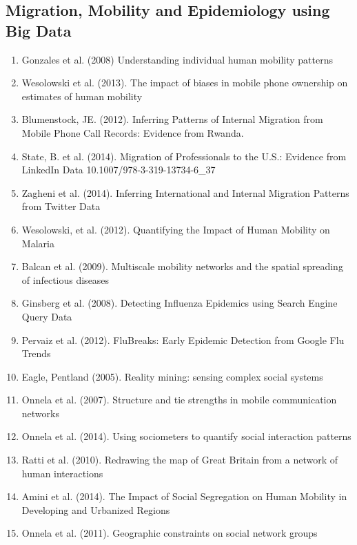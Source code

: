\subsection{Migration, Mobility and Epidemiology using Big Data}
\begin{enumerate}
\item Gonzales et al. (2008) Understanding individual human mobility patterns\cite{Gonz_lez_2008}
\item Wesolowski et al. (2013). The impact of biases in mobile phone ownership on estimates of human mobility\cite{Wesolowski_2013}
\item Blumenstock, JE. (2012). Inferring Patterns of Internal Migration from Mobile Phone Call Records: Evidence from Rwanda\cite{Blumenstock_2012}. 
\item State, B. et al. (2014). Migration of Professionals to the U.S.: Evidence from LinkedIn Data 	10.1007/978-3-319-13734-6_37\cite{State_2014}
\item Zagheni et al. (2014).  Inferring International and Internal Migration Patterns from Twitter Data \cite{Zagheni:2014:III:2567948.2576930}
\item Wesolowski, et al. (2012). Quantifying the Impact of Human Mobility on Malaria \cite{Wesolowski_2012}
\item Balcan et al. (2009). Multiscale mobility networks and the spatial spreading of infectious diseases\cite{Balcan_2009}
\item Ginsberg et al. (2008). Detecting Influenza Epidemics using Search Engine Query Data\cite{Ginsberg_2008}
\item Pervaiz et al. (2012). FluBreaks: Early Epidemic Detection from Google Flu Trends\cite{Pervaiz_2012}
\item Eagle, Pentland (2005). Reality mining: sensing complex social systems\cite{Eagle_2005}
\item Onnela et al. (2007). Structure and tie strengths in mobile communication networks\cite{Onnela_2007}
\item Onnela et al. (2014). Using sociometers to quantify social interaction patterns\cite{Onnela_2014}
\item Ratti et al. (2010). Redrawing the map of Great Britain from a network of human interactions\cite{Ratti_2010}
\item Amini et al. (2014). The Impact of Social Segregation on Human Mobility in Developing and Urbanized Regions\cite{Amini_2014}
\item Onnela et al. (2011). Geographic constraints on social network groups\cite{Onnela_2011}

\end{enumerate}
